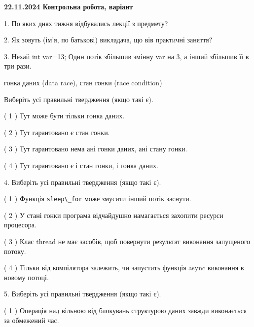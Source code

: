 \documentclass[12pt, ukrainian]{article}
\def\code#1{\Verb!#1!}
\begin{document}
\vspace{4mm}
\newpage
\begin {large}

\textbf{22.11.2024 Контрольна робота, варіант  }\par


{
1. По яких днях тижня відбувались лекції з предмету?



\vspace{5mm}
2. Як зовуть (ім'я, по батькові) викладача, що вів практичні заняття?



\vspace{5mm}
3. Нехай int var=13; Один потік збільшив змінну var на 3, а інший збільшив її в три рази.

гонка даних (data race), стан гонки (race condition)

Виберіть усі правильні твердження (якщо такі є).\par
\vspace{2mm}
( 1 ) Тут може бути тільки гонка даних.%

( 2 ) Тут гарантовано є стан гонки.%

( 3 ) Тут гарантовано нема ані гонки даних, ані стану гонки.%

( 4 ) Тут гарантовано є і стан гонки, і гонка даних.%


\vspace{5mm}
4. Виберіть усі правильні твердження (якщо такі є).\par
\vspace{2mm}

( 1 ) Функція \code{sleep\_for} може змусити інший потік заснути.%

( 2 ) У стані гонки програма відчайдушно намагається захопити ресурси процесора.%

( 3 ) Клас thread не має засобів, щоб повернути результат виконання запущеного потоку.%

( 4 ) Тільки від компілятора залежить, чи запустить функція async виконання в новому потоці.%


\vspace{5mm}
5. Виберіть усі правильні твердження (якщо такі є).\par
\vspace{2mm}

( 1 ) Операція над вільною від блокувань структурою даних завжди виконається за обмежений час.%

}
\end{large}
\end{document}
